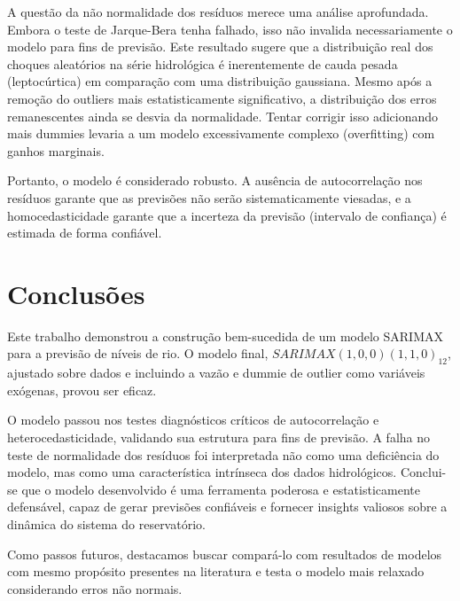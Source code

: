 \documentclass[ 12pt,a4paper ]{article} %
\begin{document}
	A questão da não normalidade dos resíduos merece uma análise aprofundada. Embora o teste de Jarque-Bera tenha falhado, isso não invalida necessariamente o modelo para fins de previsão. Este resultado sugere que a distribuição real dos choques aleatórios na série hidrológica é inerentemente de cauda pesada (leptocúrtica) em comparação com uma distribuição gaussiana. Mesmo após a remoção do outliers mais estatisticamente significativo, a distribuição dos erros remanescentes ainda se desvia da normalidade. Tentar corrigir isso adicionando mais dummies levaria a um modelo excessivamente complexo (overfitting) com ganhos marginais.
	
	
	Portanto, o modelo é considerado robusto. A ausência de autocorrelação nos resíduos garante que as previsões não serão sistematicamente viesadas, e a homocedasticidade garante que a incerteza da previsão (intervalo de confiança) é estimada de forma confiável.
	
	\section{Conclusões}
	Este trabalho demonstrou a construção bem-sucedida de um modelo SARIMAX para a previsão de níveis de rio. O modelo final, $SARIMAX(1,0,0)(1,1,0)_{12}$, ajustado sobre dados e incluindo a vazão e dummie de outlier como variáveis exógenas, provou ser eficaz.
	
	O modelo passou nos testes diagnósticos críticos de autocorrelação e heterocedasticidade, validando sua estrutura para fins de previsão. A falha no teste de normalidade dos resíduos foi interpretada não como uma deficiência do modelo, mas como uma característica intrínseca dos dados hidrológicos.
	Conclui-se que o modelo desenvolvido é uma ferramenta poderosa e estatisticamente defensável, capaz de gerar previsões confiáveis e fornecer insights valiosos sobre a dinâmica do sistema do reservatório.
	
	Como passos futuros, destacamos buscar compará-lo com resultados de modelos com mesmo propósito presentes na literatura  e testa o modelo mais relaxado considerando erros não normais.
	

	
		
\printbibliography[title={Referências}]
%		
	
\end{document}
